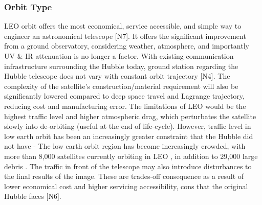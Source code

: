 \subsubsection{Orbit Type} 
 LEO orbit offers the most economical, service accessible, and simple way to engineer an astronomical telescope [N7]. It offers the significant improvement from a ground observatory, considering weather, atmosphere, and importantly UV \& IR attenuation is no longer a factor. With existing communication infrastructure surrounding the Hubble today, ground station regarding the Hubble telescope does not vary with constant orbit trajectory [N4]. The complexity of the satellite's construction/material requirement will also be significantly lowered compared to deep space travel and Lagrange trajectory, reducing cost and manufacturing error. The limitations of LEO would be the highest traffic level and higher atmospheric drag, which perturbates the satellite slowly into de-orbiting  (useful at the end of life-cycle). However, traffic level in low earth orbit has been an increasingly greater constraint that the Hubble did not have - The low earth orbit region has become increasingly crowded, with more than 8,000 satellites currently orbiting in LEO \cite{UntetherAI2024}, in addition to 29,000 large debris \cite{ESASpaceDebris}. The traffic in front of the telescope may also introduce disturbances to the final results of the image. These are trades-off consequence as a result of lower economical cost and higher servicing accessibility, cons that the original Hubble faces [N6]. 

